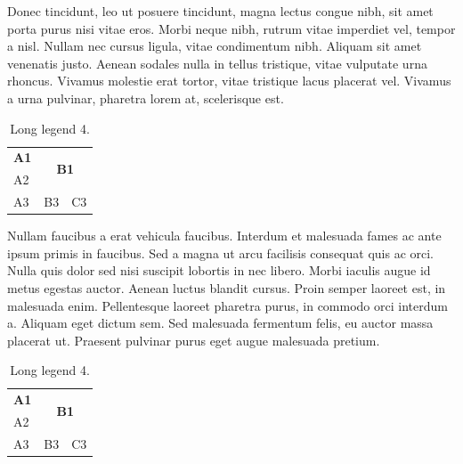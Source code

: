 \documentclass{article}
\begin{document}
	Donec tincidunt, leo ut posuere tincidunt, magna lectus congue nibh, sit amet porta purus nisi vitae eros. Morbi neque nibh, rutrum vitae imperdiet vel, tempor a nisl. Nullam nec cursus ligula, vitae condimentum nibh. Aliquam sit amet venenatis justo. Aenean sodales nulla in tellus tristique, vitae vulputate urna rhoncus. Vivamus molestie erat tortor, vitae tristique lacus placerat vel. Vivamus a urna pulvinar, pharetra lorem at, scelerisque est.
	
	\renewcommand{\arraystretch}{1.5}
	\begin{table}[H]
		\centering
		\caption[Short Legend 4]{Long legend 4.}
		\label{tab:tab4}
		\begin{tabular}{l | l | l}
			\textbf{A1} & \multicolumn{2}{c}{\multirow{2}{*}{\textbf{B1}}} \\
			\cline{1-1}
			A2          & \multicolumn{2}{l}{}                             \\
			\cline{1-3}
			A3          & B3                      & C3
		\end{tabular}
	\end{table}
	\renewcommand{\arraystretch}{1.0}  %

	Nullam faucibus a erat vehicula faucibus. Interdum et malesuada fames ac ante ipsum primis in faucibus. Sed a magna ut arcu facilisis consequat quis ac orci. Nulla quis dolor sed nisi suscipit lobortis in nec libero. Morbi iaculis augue id metus egestas auctor. Aenean luctus blandit cursus. Proin semper laoreet est, in malesuada enim. Pellentesque laoreet pharetra purus, in commodo orci interdum a. Aliquam eget dictum sem. Sed malesuada fermentum felis, eu auctor massa placerat ut. Praesent pulvinar purus eget augue malesuada pretium.
	
	\begin{table}[H]
		\centering
		\caption[Short Legend 4]{Long legend 4.}
		\label{tab:tab5}
		\begin{tabularx}{0.5\textwidth}{X | X | X}
			\centering\textbf{A1} & \multicolumn{2}{c}{\multirow{2}{*}{\textbf{B1}}} \\
			\cline{1-1}
			\hfill A2          & \multicolumn{2}{l}{}                             \\
			\hline
			A3          & B3                      & C3
		\end{tabularx}
	\end{table}
\end{document}
